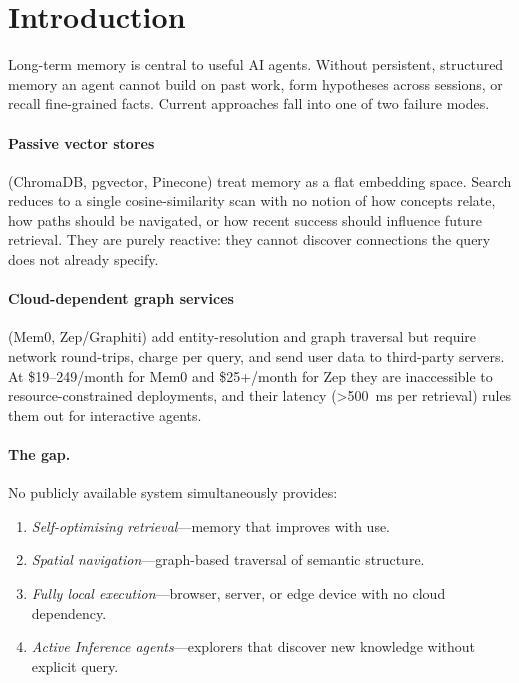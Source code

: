 \documentclass[11pt,a4paper]{article}
\begin{document}
\section{Introduction}
\label{sec:intro}

Long-term memory is central to useful AI agents.  Without persistent, structured
memory an agent cannot build on past work, form hypotheses across sessions, or
recall fine-grained facts.  Current approaches fall into one of two failure
modes.

\paragraph{Passive vector stores} (ChromaDB, pgvector, Pinecone) treat memory
as a flat embedding space.  Search reduces to a single cosine-similarity scan
with no notion of how concepts relate, how paths should be navigated, or how
recent success should influence future retrieval.  They are purely reactive:
they cannot discover connections the query does not already specify.

\paragraph{Cloud-dependent graph services} (Mem0, Zep/Graphiti) add
entity-resolution and graph traversal but require network round-trips, charge
per query, and send user data to third-party servers.  At \$19--249/month for
Mem0 and \$25+/month for Zep they are inaccessible to resource-constrained
deployments, and their latency (\textgreater500~ms per retrieval) rules them out
for interactive agents.

\paragraph{The gap.}
No publicly available system simultaneously provides:
\begin{enumerate}[nosep]
\item \emph{Self-optimising retrieval}---memory that improves with use.
\item \emph{Spatial navigation}---graph-based traversal of semantic structure.
\item \emph{Fully local execution}---browser, server, or edge device with no
      cloud dependency.
\item \emph{Active Inference agents}---explorers that discover new knowledge
      without explicit query.
\end{enumerate}
\end{document}
